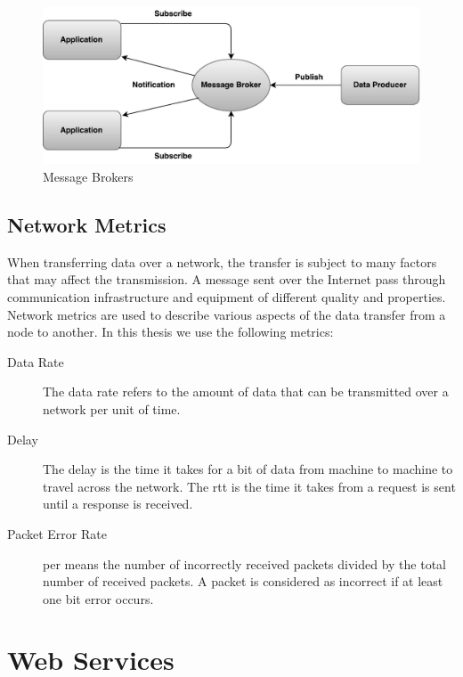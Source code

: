 \begin{figure}[h]
\centering
\includegraphics[scale=0.6]{images/pubsub.pdf}
\caption{Message Brokers}
\label{figure-message-brokers}
\end{figure}


\subsection{Network Metrics}
\label{section:network-mectrics}

When transferring data over a network, the transfer is subject to many factors
that may affect the transmission. A message sent over the Internet pass through
communication infrastructure and equipment of different quality and properties.
Network metrics are used to describe various aspects of the data transfer from a
node to another. In this thesis we use the following metrics:

\begin{description}

\item[Data Rate] The data rate refers to the amount of data that can be
transmitted over a network per unit of time.

\item[Delay] The delay is the time it takes for a bit of data from machine to
machine to travel across the network. The \gls{rtt} is the time it takes from a
request is sent until a response is received.

\item[Packet Error Rate] \gls{per} means the number of incorrectly received
packets divided by the total number of received packets. A packet is considered
as incorrect if at least one bit error occurs.

\end{description}


\section{Web Services}
\label{web-services}

